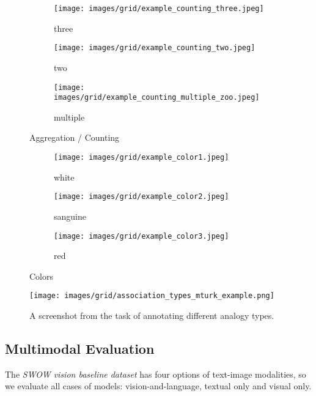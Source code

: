 \documentclass{article}
\newcommand{\swowsplit}[0]{\emph{\textit{SWOW} vision baseline dataset}}
\begin{document}
    \begin{figure}
     \begin{subfigure}{0.30\textwidth}
      \texttt{[image: images/grid/example\_counting\_three.jpeg]}
      \caption{three}
  \end{subfigure}
\hfill \begin{subfigure}{0.30\textwidth}
      \texttt{[image: images/grid/example\_counting\_two.jpeg]}
      \caption{two}
  \end{subfigure}
\hfill \begin{subfigure}{0.30\textwidth}
      \texttt{[image: images/grid/example\_counting\_multiple\_zoo.jpeg]}
      \caption{multiple}
  \end{subfigure}

  \caption{Aggregation / Counting}
  \label{fig:grid_counting}
  
   \begin{subfigure}{0.30\textwidth}
      \texttt{[image: images/grid/example\_color1.jpeg]}
      \caption{white}
  \end{subfigure}
\hfill \begin{subfigure}{0.30\textwidth}
      \texttt{[image: images/grid/example\_color2.jpeg]}
      \caption{sanguine}
  \end{subfigure}
\hfill \begin{subfigure}{0.30\textwidth}
      \texttt{[image: images/grid/example\_color3.jpeg]}
      \caption{red}
  \end{subfigure}
  \caption{Colors}
  \label{fig:grid_colors}
  
\end{figure}
 \clearpage
\newpage
\clearpage
\newpage
\begin{figure}[!htb]
\centering
\newcommand{\figlen}[0]{\columnwidth}
    \texttt{[image: images/grid/association\_types\_mturk\_example.png]}\\
     \caption{A screenshot from the task of annotating different analogy types.}
     \label{fig:mturk_association_type_task}
\end{figure}
 
\subsection{Multimodal Evaluation}
The \swowsplit{} has four options of text-image modalities, so we evaluate all cases of models: vision-and-language, textual only and visual only. 
\end{document}
